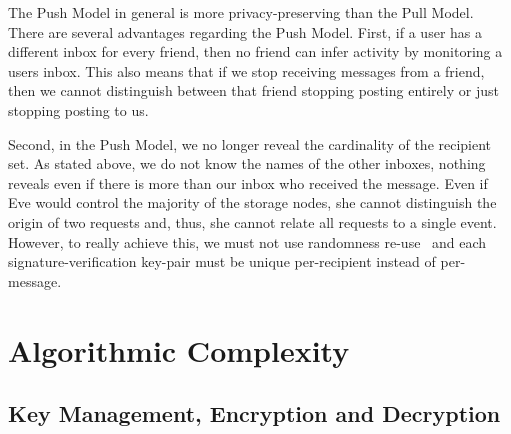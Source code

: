 The Push Model in general is more privacy-preserving than the Pull Model.
There are several advantages regarding the Push Model.
First, if a user has a different inbox for every friend, then no friend can 
infer activity by monitoring a users inbox.
This also means that if we stop receiving messages from a friend, then we 
cannot distinguish between that friend stopping posting entirely or just 
stopping posting to us.

Second, in the Push Model, we no longer reveal the cardinality of the recipient 
set.
As stated above, we do not know the names of the other inboxes, nothing reveals 
even if there is more than our inbox who received the message.
Even if Eve would control the majority of the storage nodes, she cannot 
distinguish the origin of two requests and, thus, she cannot relate all 
requests to a single event.
However, to really achieve this, we must not use randomness 
re-use~\cite{RandomnessReuse} and each signature-verification key-pair must be 
unique per-recipient instead of per-message.




\section[Complexity]{Algorithmic Complexity}\label{sec:PerformanceEvaluation}


\subsection{Key Management, Encryption and Decryption}

